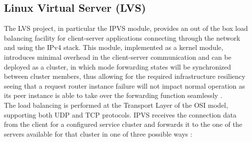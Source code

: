 \subsection{Linux Virtual Server (LVS)}
\label{subsection:LVS-implementation}
The \gls{LVS} project, in particular the \gls{IPVS} module, provides an out of the box load balancing facility for client-server applications connecting through the network and using the \gls{IPv4} stack.
This module, implemented as a kernel module, introduces minimal overhead in the client-server communication and can be deployed as a cluster, in which mode forwarding states will be synchronized between cluster members, thus allowing for the required infrastructure resiliency seeing that a request router instance failure will not impact normal operation as its peer instance is able to take over the forwarding function seamlessly \cite{IPVSSync}.\\
%
The load balancing is performed at the Transport Layer of the \gls{OSI} model, supporting both \gls{UDP} and \gls{TCP} protocols.
IPVS receives the connection data from the client for a configured service cluster and forwards it to the one of the servers available for that cluster in one of three possible ways \cite{IPVSHow}:
